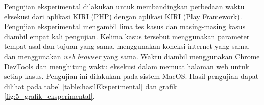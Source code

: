 Pengujian eksperimental dilakukan untuk membandingkan perbedaan waktu eksekusi dari aplikasi KIRI (PHP) dengan aplikasi KIRI (Play Framework). Pengujian eksperimental mengambil lima tes kasus dan masing-masing kasus diambil empat kali pengujian. Kelima kasus tersebut menggunakan parameter tempat asal dan tujuan yang sama, menggunakan koneksi internet yang sama, dan menggunakan \textit{web browser} yang sama. Waktu diambil menggunakan Chrome DevTools dan menghitung waktu eksekusi dalam memuat halaman web untuk setiap kasus. Pengujian ini dilakukan pada sistem MacOS. Hasil pengujian dapat dilihat pada tabel  \ref{table:hasilEksperimental} dan grafik \ref{fig:5_grafik_eksperimental}.
			
\begin{table}[H]
	\centering
	\caption{Tabel Pengujian Eksperimental}
	\label{table:hasilEksperimental}
\end{table}


